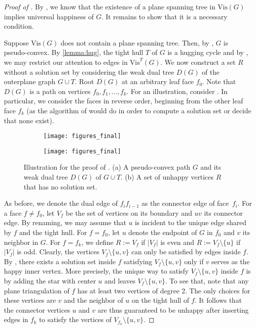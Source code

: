 \documentclass[a4paper,runningheads,cleveref,thm-restate]{lipics-v2021}
\newcommand{\Vis}[1]{\ensuremath{\mathrm{Vis}(#1)}}
\newcommand{\VisT}[1]{\ensuremath{\mathrm{Vis}^T(#1)}}
\newcommand{\hset}{solution set\xspace}
\newcommand{\pseudoconvex}{pseudo-convex\xspace}
\newcommand{\hug}{hugging cycle\xspace}
\begin{document}
\begin{proof} [Proof of ]
	By , we know that the existence of a plane spanning tree in \Vis{G} implies universal happiness of $G$. It remains to show that it is a necessary condition.
 	
	Suppose \Vis{G} does not contain a plane spanning tree. 
	Then, by , $G$ is \pseudoconvex. 
	{By \cref{lemma:hug}, the tight hull $T$ of $G$ is a \hug and}
	by , we may restrict our attention to edges in $\VisT{G}$. 
	We now construct a 
	set $R$ without a \hset by considering the weak dual tree $D(G)$ of the outerplane graph $G\cup T$. 
	Root $D(G)$ at an arbitrary leaf face $f_{0}$. Note that $D(G)$ is a path on vertices $f_{0},f_{1},\dots, f_{k}$. For an illustration, consider .
	In particular, we consider the faces in reverse order, beginning from the other leaf face $f_k$ (as the algorithm of  would do in order to compute a \hset or decide that none exist).
	
	\begin{figure}[htb]
		\centering
		\begin{subfigure}{.45\textwidth}
			\centering
			\texttt{[image: figures\_final]}
			\caption{}
			\label{fig:pathUnhappyA}
		\end{subfigure}\hfill
	\begin{subfigure}{.45\textwidth}
		\centering
		\texttt{[image: figures\_final]}
		\caption{}
		\label{fig:pathUnhappyB}
	\end{subfigure}\hfill
		\caption{Illustration for the proof of . (a) A \pseudoconvex path $G$ and its weak dual tree $D(G)$ of $G\cup T$. (b) A set of unhappy vertices $R$ that has no \hset.}
		\label{fig:pathUnhappy}
	\end{figure}
	
	As before, we denote the dual edge of $f_{i}f_{i-1}$ as the {connector edge} of face~$f_{i}$. 
	For a face $f \neq f_{0}$, let $V_{f}$ be the set of vertices on its boundary and $uv$ its connector edge. 
	By renaming, we may assume that $u$ is incident to the unique edge shared by $f$ and the tight hull. 
	For $f=f_0$, let $u$ denote the endpoint of $G$ in $f_0$ and $v$ its neighbor in $G$.
	For $f=f_k$, we define $R:=V_{f}$ if $|V_{f}|$ is even and $R:=V_{f} \setminus \{u\}$ if $|V_{f}|$ is odd.
	Clearly, the vertices $V_f\setminus\{u,v\}$ can only be satisfied by edges inside $f$. 
	By , there exists a \hset inside $f$ satisfying $V_f\setminus\{u,v\}$ only if $v$ serves as the happy inner vertex. 
	More precisely, the unique way to satisfy $V_{f} \setminus \{u,v\}$ inside $f$ is by adding the star with center $u$ and leaves $V_{f} \setminus \{u,v\}$. 
	To see that, note that any plane triangulation of $f$ has at least two vertices of degree 2. The only choices for these vertices are $v$ and the neighbor of $u$ on the tight hull of $f$.
	It follows that the connector vertices $u$ and $v$ are thus guaranteed to be unhappy after inserting edges in $f_{k}$ to satisfy the vertices of $V_{f_k} \setminus \{u,v\}$.
	

\end{proof}
\end{document}
